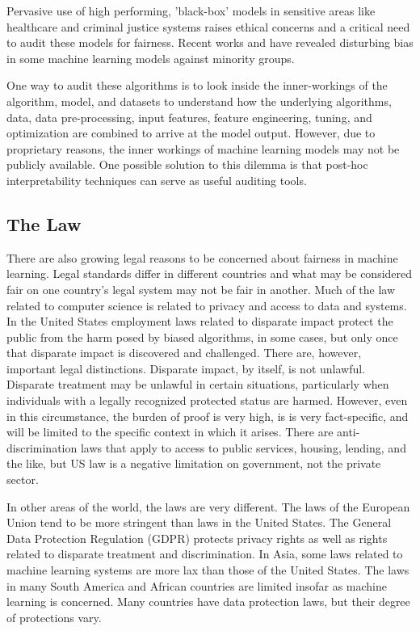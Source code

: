 \documentclass[conference]{IEEEtran}
\begin{document}
Pervasive use of high performing, 'black-box' models in sensitive areas like healthcare\cite{b3} and criminal justice systems raises ethical concerns and a critical need to audit these models for fairness. Recent works\cite{b4} and \cite{b5} have revealed disturbing bias in some machine learning models against minority groups. 

One way to audit these algorithms is to look inside the inner-workings of the algorithm, model, and datasets to understand how the underlying algorithms, data, data pre-processing, input features, feature engineering, tuning, and optimization are combined to arrive at the model output. However, due to proprietary reasons, the inner workings of machine learning models may not be publicly available. One possible solution to this dilemma is that post-hoc interpretability techniques can serve as useful auditing tools.

\subsection{The Law}
There are also growing legal reasons to be concerned about fairness in machine learning. Legal standards differ in different countries and what may be considered fair on one country's legal system may not be fair in another. Much of the law related to computer science is related to privacy and access to data and systems. In the United States employment laws related to disparate impact protect the public from the harm posed by biased algorithms, in some cases, but only once that disparate impact is discovered and challenged. There are, however, important legal distinctions. Disparate impact, by itself, is not unlawful. Disparate treatment may be unlawful in certain situations, particularly when individuals with a legally recognized protected status are harmed. However, even in this circumstance, the burden of proof is very high, is is very fact-specific, and will be limited to the specific context in which it arises.
There are anti-discrimination laws that apply to access to public services, housing, lending, and the like, but US law is a negative limitation on government, not the private sector.

In other areas of the world, the laws are very different. The laws of the European Union tend to be more stringent than laws in the United States. The General Data Protection Regulation (GDPR) protects privacy rights as well as rights related to disparate treatment and discrimination. In Asia, some laws related to machine learning systems are more lax than those of the United States. The laws in many South America and African countries are limited insofar as machine learning is concerned. Many countries have data protection laws, but their degree of protections vary.
\end{document}
